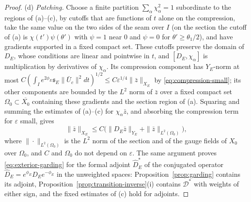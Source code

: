 \documentclass[11pt]{amsart}
\theoremstyle{definition}
\theoremstyle{remark}
\theoremstyle{plain}
\numberwithin{equation}{section}
\newcommand{\eps}{\varepsilon}
\begin{document}
\begin{proof}
(d) \emph{Patching.} Choose a finite partition $\sum_\alpha\chi_\alpha^2=1$
subordinate to the regions of (a)--(c), by cutoffs that are functions of $t$ alone
on the compression, take the same value on the two sides of the seam over $I$ (on
the section the cutoff of (a) is $\chi(t')\psi(\theta')$ with $\psi=1$ near $0$ and
$\psi=0$ for $\theta'\ge\theta_1/2$), and have gradients supported in a fixed
compact set. These cutoffs preserve the domain of $D_E$, whose conditions are linear
and pointwise in $t$, and $[D_E,\chi_\alpha]$ is multiplication by derivatives of
$\chi_\alpha$. Its compression component has $Y_E$-norm at most
$C(\int_Ie^{2\phi_E}{\mathfrak s}_E\|\bar U_c\|^2dt)^{1/2}\le C\eps^{1/4}\|\bar z\|_{X_E}$ by
\eqref{eq:compression-small}; its other components are bounded by the $L^2$ norm of
$\bar z$ over a fixed compact set $\Omega_0\subset\overline{X_0}$ containing these
gradients and the section region of (a). Squaring and summing the estimates of
(a)--(c) for $\chi_\alpha\bar z$, and absorbing the compression term for $\eps$
small, gives
\begin{equation}\label{eq:exterior-garding}
\|\bar z\|_{X_E}\le C\bigl(\|D_E\bar z\|_{Y_E}+\|\bar z\|_{L^2(\Omega_0)}\bigr),
\end{equation}
where $\|\cdot\|_{L^2(\Omega_0)}$ is the $L^2$ norm of the section and of the gauge
fields of $X_0$ over $\Omega_0$, and $C$ and $\Omega_0$ do not depend on $\eps$.
The same argument proves \eqref{eq:exterior-garding} for the formal adjoint
$\widehat D_E^*$ of the conjugated operator $\widehat D_E=e^{\phi_E}D_Ee^{-\phi_E}$
in the unweighted spaces: Proposition~\ref{prop:garding} contains its adjoint,
Proposition~\ref{prop:transition-inverse}(i) contains $\mathcal D^*$ with weights of
either sign, and the fixed estimates of (c) hold for adjoints.


\end{proof}
\end{document}
